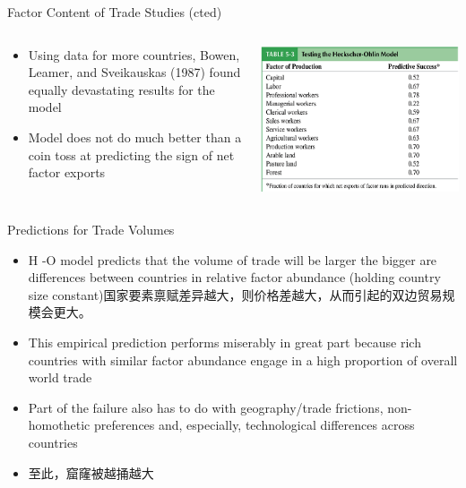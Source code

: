 \documentclass[10pt,hyperref={CJKbookmarks=true},xcolor=dvipsnames,aspectratio=169]{beamer}
\begin{document}
\begin{frame}{Factor Content of Trade Studies (cted) }


\begin{columns}[onlytextwidth]
\begin{column}{0.5\textwidth}
\begin{itemize}
\item Using data for more countries, Bowen, Leamer, and Sveikauskas (1987)
found equally devastating results for the model 
\item Model does not do much better than a coin toss at predicting the sign
of net factor exports 
\end{itemize}

\end{column}
\begin{column}{0.5\textwidth}
\includegraphics[width=\columnwidth]{fig/ho/lec5-17}
\end{column}
\end{columns}

\end{frame}

\begin{frame}{Predictions for Trade Volumes }

\begin{itemize}
\item H -O model predicts that the volume of trade will be larger the bigger
are differences between countries in relative factor abundance (holding
country size constant)国家要素禀赋差异越大，则价格差越大，从而引起的双边贸易规模会更大。 
\item This empirical prediction performs miserably in great part because
rich countries with similar factor abundance engage in a high proportion
of overall world trade 
\item Part of the failure also has to do with geography/trade frictions,
non-homothetic preferences and, especially, technological differences
across countries 
\item 至此，窟窿被越捅越大
\end{itemize}
\end{frame}
\end{document}
